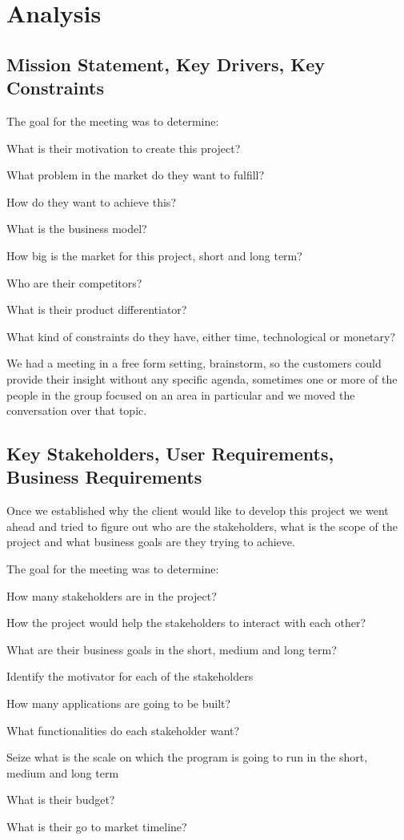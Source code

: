 \section{Analysis}
\subsection{Mission Statement, Key Drivers, Key Constraints}
The goal for the meeting was to determine:
\begin{packed_enum}
    \item What is their motivation to create this project?
    \item What problem in the market do they want to fulfill?
    \item How do they want to achieve this?
    \item What is the business model?
    \item How big is the market for this project, short and long term?
    \item Who are their competitors?
    \item What is their product differentiator?
    \item What kind of constraints do they have, either time, 
    technological or monetary?
\end{packed_enum}

\noindent We had a meeting in a free form setting, brainstorm, so the customers could 
provide their insight without any specific agenda, sometimes one or more of the 
people in the group focused on an area in particular and we moved the 
conversation over that topic.

\pagebreak
\subsection{Key Stakeholders, User Requirements, Business Requirements}
Once we established why the client would like to develop this project we went 
ahead and tried to figure out who are the stakeholders, what is the scope of 
the project and what business goals are they trying to achieve. \newline

\noindent The goal for the meeting was to determine:
\begin{packed_enum}
    \item How many stakeholders are in the project?
    \item How the project would help the stakeholders to interact with 
    each other?
    \item What are their business goals in the short, medium and long term?
    \item Identify the motivator for each of the stakeholders
    \item How many applications are going to be built?
    \item What functionalities do each stakeholder want? 
    \item Seize what is the scale on which the program is going to run in the 
    short, medium and long term
    \item What is their budget?
    \item What is their go to market timeline?
\end{packed_enum}

